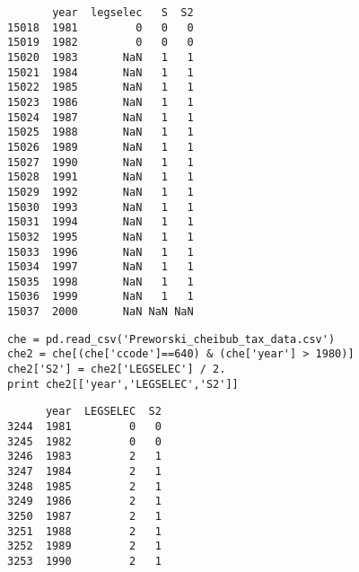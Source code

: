 \documentclass[12pt,fleqn]{article}\usepackage{common}
\begin{document}
\begin{verbatim}
       year  legselec   S  S2
15018  1981         0   0   0
15019  1982         0   0   0
15020  1983       NaN   1   1
15021  1984       NaN   1   1
15022  1985       NaN   1   1
15023  1986       NaN   1   1
15024  1987       NaN   1   1
15025  1988       NaN   1   1
15026  1989       NaN   1   1
15027  1990       NaN   1   1
15028  1991       NaN   1   1
15029  1992       NaN   1   1
15030  1993       NaN   1   1
15031  1994       NaN   1   1
15032  1995       NaN   1   1
15033  1996       NaN   1   1
15034  1997       NaN   1   1
15035  1998       NaN   1   1
15036  1999       NaN   1   1
15037  2000       NaN NaN NaN
\end{verbatim}

\begin{verbatim}
che = pd.read_csv('Preworski_cheibub_tax_data.csv')
che2 = che[(che['ccode']==640) & (che['year'] > 1980)]
che2['S2'] = che2['LEGSELEC'] / 2.
print che2[['year','LEGSELEC','S2']]
\end{verbatim}

\begin{verbatim}
      year  LEGSELEC  S2
3244  1981         0   0
3245  1982         0   0
3246  1983         2   1
3247  1984         2   1
3248  1985         2   1
3249  1986         2   1
3250  1987         2   1
3251  1988         2   1
3252  1989         2   1
3253  1990         2   1
\end{verbatim}
\end{document}
